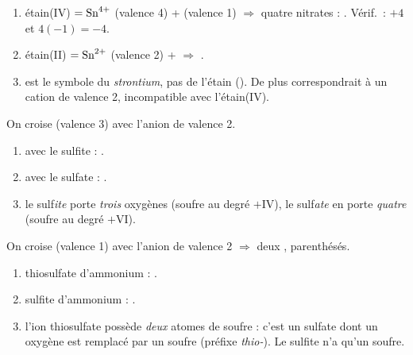 \documentclass[11pt,a4paper]{article}
\begin{document}
\begin{corrige}
\begin{enumerate}[label=\alph*)]
  \item étain(IV) $=\ce{Sn^4+}$ (valence 4) +  (valence 1) $\Rightarrow$ quatre nitrates :
        . Vérif.\ : $+4$ et $4(-1)=-4$.
  \item étain(II) $=\ce{Sn^2+}$ (valence 2) +  $\Rightarrow$ .
  \item {} est le symbole du \emph{strontium}, pas de l'étain (). De plus 
        correspondrait à un cation de valence 2, incompatible avec l'étain(IV).
\end{enumerate}
\end{corrige}

\begin{corrige}
On croise  (valence 3) avec l'anion de valence 2.
\begin{enumerate}[label=\alph*)]
  \item avec le sulfite  : .
  \item avec le sulfate  : .
  \item le sulf\emph{ite}  porte \emph{trois} oxygènes (soufre au degré $+\mathrm{IV}$), le
        sulf\emph{ate}  en porte \emph{quatre} (soufre au degré $+\mathrm{VI}$).
\end{enumerate}
\end{corrige}

\begin{corrige}
On croise  (valence 1) avec l'anion de valence 2 $\Rightarrow$ deux , parenthésés.
\begin{enumerate}[label=\alph*)]
  \item thiosulfate d'ammonium : .
  \item sulfite d'ammonium : .
  \item l'ion thiosulfate  possède \emph{deux} atomes de soufre : c'est un sulfate dont un
        oxygène est remplacé par un soufre (préfixe \emph{thio-}). Le sulfite  n'a qu'un soufre.
\end{enumerate}
\end{corrige}
\end{document}
